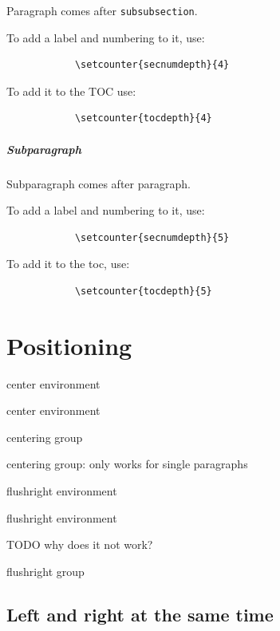 \documentclass[12pt]{article}
\begin{document}
          Paragraph comes after \lstinline|subsubsection|.

          To add a label and numbering to it, use:

          \begin{lstlisting}
            \setcounter{secnumdepth}{4}
          \end{lstlisting}

          To add it to the TOC use:

          \begin{lstlisting}
            \setcounter{tocdepth}{4}
          \end{lstlisting}

        \subparagraph{Subparagraph}\label{subparagraph}

          Subparagraph comes after paragraph.

          To add a label and numbering to it, use:

          \begin{lstlisting}
            \setcounter{secnumdepth}{5}
          \end{lstlisting}

          To add it to the toc, use:

          \begin{lstlisting}
            \setcounter{tocdepth}{5}
          \end{lstlisting}

\section{Positioning}\label{positioning}

  \begin{center}
    center environment

    center environment
  \end{center}

  {\centering
    centering group

    centering group: only works for single paragraphs
  }

  \begin{flushright}
    flushright environment

    flushright environment
  \end{flushright}

  TODO why does it not work?

  {\flushright flushright group}

  \subsection{Left and right at the same time}
\end{document}
